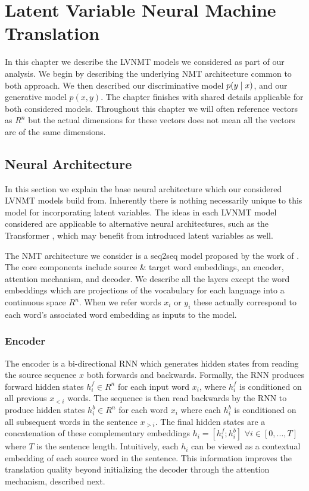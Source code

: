 \chapter{Latent Variable Neural Machine Translation}

In this chapter we describe the \ac{LVNMT} models we considered as part of our analysis. We begin by describing the underlying \ac{NMT} architecture common to both approach. We then described our discriminative model $p(y \; | \;{x})$, and our generative model $p(x, y)$. The chapter finishes with shared details applicable for both considered models. Throughout this chapter we will often reference vectors as $R^{n}$ but the actual dimensions for these vectors does not mean all the vectors are of the same dimensions. 


\section{Neural Architecture}

In this section we explain the base neural architecture which our considered \ac{LVNMT} models build from. Inherently there is nothing necessarily unique to this model for incorporating latent variables.  The ideas in each \ac{LVNMT} model considered are applicable to alternative neural architectures, such as the Transformer \cite{vaswani2017attentionTransformer}, which may benefit from introduced latent variables as well. 

The \ac{NMT} architecture we consider is a \ac{seq2seq} model proposed by the work of  \citet{bahdanau2014NMTBYJoint}. The core components include source \& target word embeddings, an encoder, attention mechanism, and decoder. We describe all the layers except the word embeddings which are projections of the vocabulary for each language into a continuous space $R^{n}$. When we refer  words $x_{i}$ or $y_{i}$ these actually correspond to each word's associated word embedding as inputs to the model.  

\subsection{Encoder}
The encoder is a bi-directional \ac{RNN} which generates hidden states from reading the source sequence $x$ both forwards and backwards. Formally, the \ac{RNN} produces forward hidden states $h^{f}_{i} \in R^{n}$ for each input word $x_{i}$, where $h^{f}_{i}$ is conditioned on all previous $x_{<i}$ words. The sequence is then read backwards by the \ac{RNN} to produce hidden states $h^{b}_{i} \in R^{n}$ for each word $x_{i}$ where each $h^{b}_{i}$ is conditioned on all subsequent words in the sentence $x_{>i}$. The final hidden states are a concatenation of these complementary embeddings $h_{i}  = [h^{f}_{i} ; h^{b}_{i}]$ $ \forall i \in [0,...,T]$ where $T$ is the sentence length. Intuitively, each $h_{i}$ can be viewed as a contextual embedding of each source word in the sentence. This information improves the translation quality beyond initializing the decoder through the attention mechanism, described next. 

